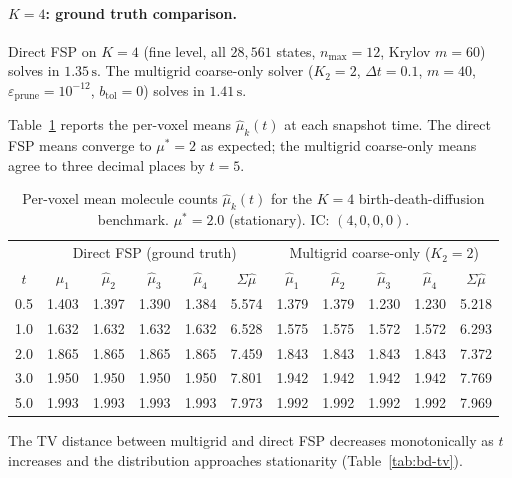 \documentclass[review,onefignum,onetabnum]{siamart171218}
\begin{document}
\paragraph{$K = 4$: ground truth comparison.}
Direct FSP on $K = 4$ (fine level, all $28{,}561$ states, $n_{\max} = 12$,
Krylov $m = 60$) solves in $1.35\,\mathrm{s}$.  The multigrid coarse-only
solver ($K_2 = 2$, $\Delta t = 0.1$, $m = 40$,
$\varepsilon_{\mathrm{prune}} = 10^{-12}$, $b_{\mathrm{tol}} = 0$)
solves in $1.41\,\mathrm{s}$.

Table~\ref{tab:bd-means} reports the per-voxel means $\hat{\mu}_k(t)$
at each snapshot time.  The direct FSP means converge to $\mu^* = 2$ as
expected; the multigrid coarse-only means agree to three decimal places by
$t = 5$.

\begin{table}[ht]
\centering
\caption{Per-voxel mean molecule counts $\hat{\mu}_k(t)$
  for the $K=4$ birth-death-diffusion benchmark.
  $\mu^* = 2.0$ (stationary).
  IC: $(4, 0, 0, 0)$.}
\label{tab:bd-means}
\begin{tabular}{c|cccc|c||cccc|c}
\hline
& \multicolumn{5}{c||}{Direct FSP (ground truth)}
& \multicolumn{5}{c}{Multigrid coarse-only ($K_2=2$)} \\
$t$ & $\hat\mu_1$ & $\hat\mu_2$ & $\hat\mu_3$ & $\hat\mu_4$ & $\Sigma\hat\mu$
    & $\hat\mu_1$ & $\hat\mu_2$ & $\hat\mu_3$ & $\hat\mu_4$ & $\Sigma\hat\mu$ \\
\hline
0.5 & 1.403 & 1.397 & 1.390 & 1.384 & 5.574
    & 1.379 & 1.379 & 1.230 & 1.230 & 5.218 \\
1.0 & 1.632 & 1.632 & 1.632 & 1.632 & 6.528
    & 1.575 & 1.575 & 1.572 & 1.572 & 6.293 \\
2.0 & 1.865 & 1.865 & 1.865 & 1.865 & 7.459
    & 1.843 & 1.843 & 1.843 & 1.843 & 7.372 \\
3.0 & 1.950 & 1.950 & 1.950 & 1.950 & 7.801
    & 1.942 & 1.942 & 1.942 & 1.942 & 7.769 \\
5.0 & 1.993 & 1.993 & 1.993 & 1.993 & 7.973
    & 1.992 & 1.992 & 1.992 & 1.992 & 7.969 \\
\hline
\end{tabular}
\end{table}

The TV distance between multigrid and direct FSP decreases
monotonically as $t$ increases and the distribution approaches
stationarity (Table~\ref{tab:bd-tv}).
\end{document}
